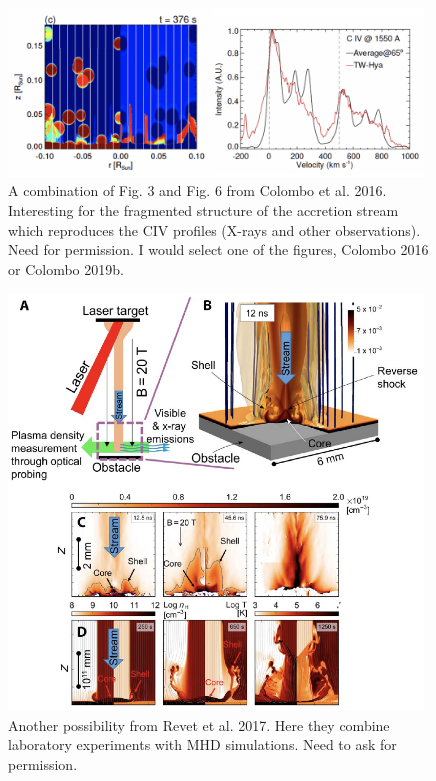 \begin{figure}
    \centering
    \includegraphics[width=11cm]{figs/colombo2016.png}
    \caption{A combination of Fig. 3 and Fig. 6 from Colombo et al. 2016. Interesting for the fragmented structure of the accretion stream which reproduces the CIV profiles (X-rays and other observations). Need for permission. I would select one of the figures, Colombo 2016 or Colombo 2019b.}
    \label{fig:colombo2016}
\end{figure}

\begin{figure}
    \centering
    \includegraphics[width=11cm]{figs/Revet2017.png}
    \caption{Another possibility from Revet et al. 2017. Here they combine laboratory experiments with MHD simulations. Need to ask for permission.}
    \label{fig:revet2017}
\end{figure}
